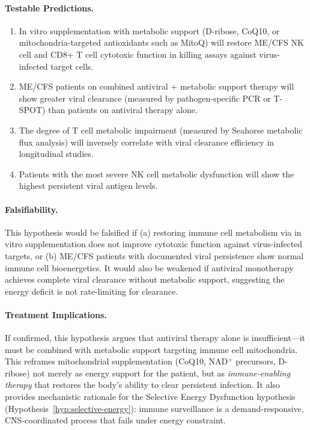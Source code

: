 \begin{hypothesis}
\paragraph{Testable Predictions.}
\begin{enumerate}
    \item In vitro supplementation with metabolic support (D-ribose, CoQ10, or mitochondria-targeted antioxidants such as MitoQ) will restore ME/CFS NK cell and CD8+ T cell cytotoxic function in killing assays against virus-infected target cells.
    \item ME/CFS patients on combined antiviral + metabolic support therapy will show greater viral clearance (measured by pathogen-specific PCR or T-SPOT) than patients on antiviral therapy alone.
    \item The degree of T cell metabolic impairment (measured by Seahorse metabolic flux analysis) will inversely correlate with viral clearance efficiency in longitudinal studies.
    \item Patients with the most severe NK cell metabolic dysfunction will show the highest persistent viral antigen levels.
\end{enumerate}

\paragraph{Falsifiability.}
This hypothesis would be falsified if (a) restoring immune cell metabolism via in vitro supplementation does not improve cytotoxic function against virus-infected targets, or (b) ME/CFS patients with documented viral persistence show normal immune cell bioenergetics. It would also be weakened if antiviral monotherapy achieves complete viral clearance without metabolic support, suggesting the energy deficit is not rate-limiting for clearance.

\paragraph{Treatment Implications.}
If confirmed, this hypothesis argues that antiviral therapy alone is insufficient---it must be combined with metabolic support targeting immune cell mitochondria. This reframes mitochondrial supplementation (CoQ10, NAD$^+$ precursors, D-ribose) not merely as energy support for the patient, but as \emph{immune-enabling therapy} that restores the body's ability to clear persistent infection. It also provides mechanistic rationale for the Selective Energy Dysfunction hypothesis (Hypothesis~\ref{hyp:selective-energy}): immune surveillance is a demand-responsive, CNS-coordinated process that fails under energy constraint.


\end{hypothesis}
